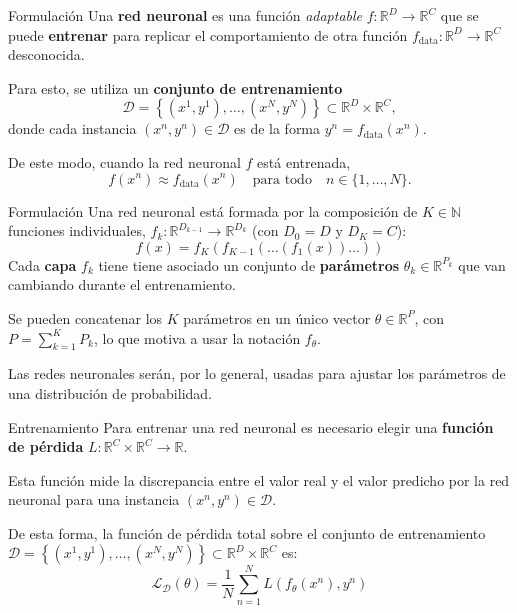 \documentclass{beamer}
\newcommand{\R}{\mathbb{R}}
\newcommand{\N}{\mathbb{N}}
\begin{document}
\begin{frame}{Formulación}
    Una \textbf{red neuronal} es una función \textit{adaptable} $f:\R^D\to\R^C$ que se puede \textbf{entrenar} para replicar el comportamiento de otra función $f_\text{data}:\R^D\to\R^C$ desconocida.

    Para esto, se utiliza un \textbf{conjunto de entrenamiento}
    \begin{equation*}
        \mathcal{D}=\left\{(x^1,y^1),\ldots,(x^N,y^N)\right\}\subset\R^D\times\R^C,
    \end{equation*}
    donde cada instancia $(x^n,y^n)\in\mathcal{D}$ es de la forma $y^n=f_\text{data}(x^n)$.

    De este modo, cuando la red neuronal $f$ está entrenada,
    \begin{equation*}
        f(x^n)\approx f_\text{data}(x^n)
        \quad\text{para todo}\quad
        n\in\{1,\ldots,N\}.
    \end{equation*}
\end{frame}

\begin{frame}{Formulación}
    Una red neuronal está formada por la composición de $K\in\N$ funciones individuales, $f_k:\R^{D_{k-1}}\to\R^{D_k}$ (con $D_0=D$ y $D_K=C$):
    \begin{equation*}
        f(x)=f_K(f_{K-1}(...(f_1(x))...))
    \end{equation*}
    Cada \textbf{capa} $f_k$ tiene tiene asociado un conjunto de \textbf{parámetros} $\theta_k\in\R^{P_k}$ que van cambiando durante el entrenamiento.

    Se pueden concatenar los $K$ parámetros en un único vector $\theta\in\R^P$, con $P=\sum_{k=1}^K P_k$, lo que motiva a usar la notación $f_\theta$.

    Las redes neuronales serán, por lo general, usadas para ajustar los parámetros de una distribución de probabilidad.
\end{frame}

\begin{frame}{Entrenamiento}
    Para entrenar una red neuronal es necesario elegir una \textbf{función de pérdida} $L:\R^C\times\R^C\to\R$.

    Esta función mide la discrepancia entre el valor real y el valor predicho por la red neuronal para una instancia $(x^n,y^n)\in\mathcal{D}$.

    De esta forma, la función de pérdida total sobre el conjunto de entrenamiento $\mathcal{D}=\left\{(x^1,y^1),\ldots,(x^N,y^N)\right\}\subset\R^D\times\R^C$ es:
    \begin{equation*}
        \mathcal{L}_\mathcal{D}\left(\theta\right)=\frac{1}{N}\sum_{n=1}^N L\left(f_\theta(x^n),y^n\right)
    \end{equation*}
\end{frame}
\end{document}
